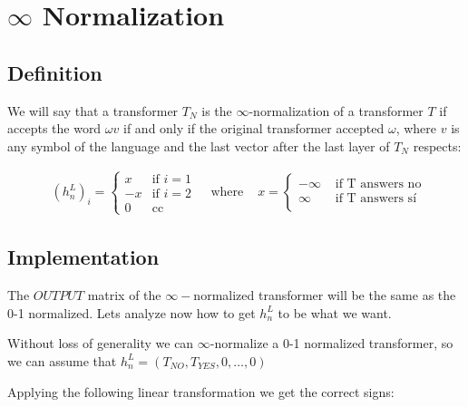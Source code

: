 \section*{$\infty$ Normalization}

\subsection*{Definition}

We will say that a transformer $T_N$ is the $\infty$-normalization of a transformer $T$ if accepts the word $\omega v$ if and only if the original transformer accepted $\omega$, where $v$ is any symbol of the language and the last vector after the last layer of $T_N$ respects:

\begin{align*}
    & (h_n^L)_i =
    \begin{cases}
    x & \text{if } i = 1 \\
    -x & \text{if } i = 2 \\
    0 & \text{cc }
    \end{cases} 
    & \text{ where }
    & x = 
    \begin{cases}
    -\infty & \text{ if T answers no }  \\
    \infty & \text{ if T answers sí } \\
    \end{cases} 
\end{align*}


\subsection*{Implementation}

The $OUTPUT$ matrix of the $\infty-$normalized transformer will be the same as the 0-1 normalized. Lets analyze now how to get $h_n^L$ to be what we want.

Without loss of generality we can $\infty$-normalize a 0-1 normalized transformer, so we can assume that $h_n^L = (T_{NO}, T_{YES}, 0, \dots, 0)$

Applying the following linear transformation we get the correct signs:

